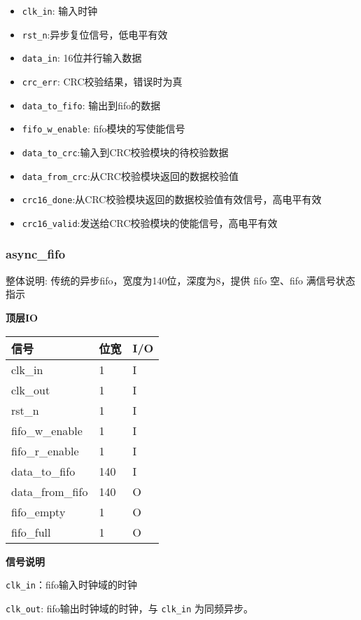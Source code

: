 \documentclass[12pt,]{article}
\providecommand{\tightlist}{%
  \setlength{\itemsep}{0pt}\setlength{\parskip}{0pt}}
\begin{document}
\begin{itemize}
\tightlist
\item
  \texttt{clk\_in}: 输入时钟
\item
  \texttt{rst\_n}:异步复位信号，低电平有效
\item
  \texttt{data\_in}: 16位并行输入数据
\item
  \texttt{crc\_err}: CRC校验结果，错误时为真
\item
  \texttt{data\_to\_fifo}: 输出到fifo的数据
\item
  \texttt{fifo\_w\_enable}: fifo模块的写使能信号
\item
  \texttt{data\_to\_crc}:输入到CRC校验模块的待校验数据
\item
  \texttt{data\_from\_crc}:从CRC校验模块返回的数据校验值
\item
  \texttt{crc16\_done}:从CRC校验模块返回的数据校验值有效信号，高电平有效
\item
  \texttt{crc16\_valid}:发送给CRC校验模块的使能信号，高电平有效
\end{itemize}

\hypertarget{async_fifo}{%
\subsubsection{async\_fifo}\label{async_fifo}}

整体说明: 传统的异步fifo，宽度为140位，深度为8，提供 fifo 空、fifo
满信号状态指示

\textbf{顶层IO}

\begin{longtable}[]{@{}lll@{}}
\toprule\noalign{}
信号 & 位宽 & I/O \\
\midrule\noalign{}
\endhead
\bottomrule\noalign{}
\endlastfoot
clk\_in & 1 & I \\
clk\_out & 1 & I \\
rst\_n & 1 & I \\
fifo\_w\_enable & 1 & I \\
fifo\_r\_enable & 1 & I \\
data\_to\_fifo & 140 & I \\
data\_from\_fifo & 140 & O \\
fifo\_empty & 1 & O \\
fifo\_full & 1 & O \\
\end{longtable}

\textbf{信号说明}

\texttt{clk\_in}：fifo输入时钟域的时钟

\texttt{clk\_out}: fifo输出时钟域的时钟，与 \texttt{clk\_in}
为同频异步。
\end{document}
